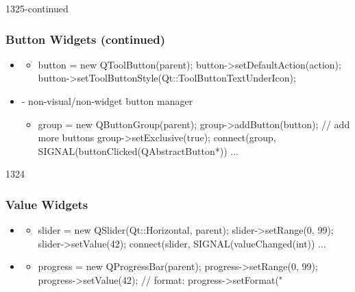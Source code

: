 \begin{slide}[fragile]{1325-continued}
  \frametitle{Button Widgets (continued)}
 \begin{itemize}
  \item \textbf{}
    \begin{itemize}
    \item[]
    \begin{cpp}
button = new QToolButton(parent);
button->setDefaultAction(action);
button->setToolButtonStyle(Qt::ToolButtonTextUnderIcon);
     \end{cpp}
   \end{itemize}
  \item \textbf{} - non-visual/non-widget button manager
    \begin{itemize}
   \item[]
     \begin{cpp}
group = new QButtonGroup(parent);
group->addButton(button); // add more buttons
group->setExclusive(true);
connect(group, SIGNAL(buttonClicked(QAbstractButton*)) ...
     \end{cpp}
   \end{itemize}
  \end{itemize}
\end{slide}

\begin{slide}[fragile]{1324}
  \frametitle{Value Widgets}
 \begin{itemize}
  \item \textbf{}
    \begin{itemize}
    \item[]
      \begin{cpp}
slider = new QSlider(Qt::Horizontal, parent);
slider->setRange(0, 99);
slider->setValue(42);
connect(slider, SIGNAL(valueChanged(int)) ...
      \end{cpp}
    \end{itemize}
  \item \textbf{}
    \begin{itemize}
    \item[]
      \begin{cpp}
progress = new QProgressBar(parent);
progress->setRange(0, 99);
progress->setValue(42);
// format: %
progress->setFormat("%
    \end{cpp}
   \end{itemize}
 \end{itemize}
\end{slide}

